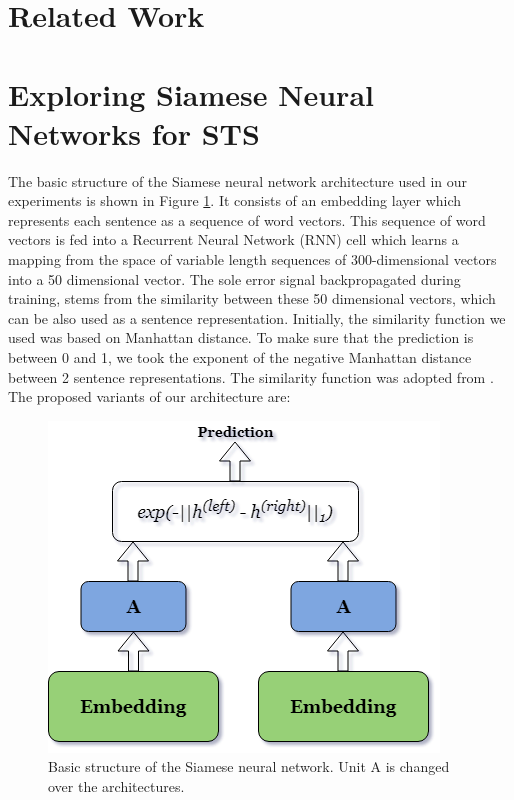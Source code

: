 \section{Related Work}

\section{Exploring Siamese Neural Networks for STS}

The basic structure of the Siamese neural network architecture used in our experiments is shown in Figure \ref{fig:siamese}. It consists of an embedding layer which represents each sentence as a sequence of word vectors. This sequence of word vectors is fed into a Recurrent Neural Network (RNN) cell which learns a mapping from the space of variable length sequences of 300-dimensional vectors into a 50 dimensional vector. The sole error signal backpropagated during training, stems from the similarity between these 50 dimensional vectors, which can be also used as a sentence representation. Initially, the similarity function we used was based on Manhattan distance. To make sure that the prediction is between 0 and 1, we took the exponent of the negative Manhattan distance between 2 sentence representations. The similarity function was adopted from \citet{Mueller_Thyagarajan_2016}. The proposed variants of our architecture are:


\begin{figure}[ht]
	\centering
	\includegraphics[scale=0.5]{figures/semantic_textual_similarity/siamese_neural_networks/siamese_architecture.png}
	\caption{Basic structure of the Siamese neural network. Unit A is changed over the architectures.}
	\label{fig:siamese}
\end{figure}

